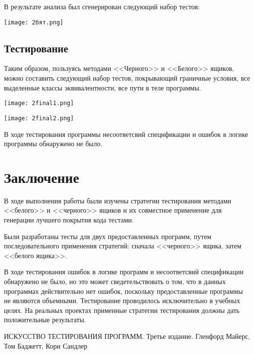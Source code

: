 \documentclass[12pt]{article}
\begin{document}
В результате анализа был сгенерирован следующий набор тестов:

\vskip 1cm
{
    \centering
    \texttt{[image: 2бят.png]}
   
    \label{fig:i1}
}


\subsection{Тестирование}


Таким образом, пользуясь методами <<Черного>> и <<Белого>>
ящиков, можно составить следующий набор тестов, покрывающий граничные условия, все выделенные классы эквивалентности, все пути в теле программы.

\vskip 1cm
{
    \centering
    \texttt{[image: 2final1.png]}
   
    \label{fig:i1}
}


{
    \centering
    \texttt{[image: 2final2.png]}
   
    \label{fig:i1}
}

\vskip 1cm
В ходе тестирования программы несоответсвий спецификации и ошибок в логике программы обнаружено не было.



\newpage

\section*{Заключение}
В ходе выполнения работы были изучены стратегии тестирования методами <<белого>> и <<черного>> ящиков и их совместное применение для генерации лучшего покрытия кода тестами.

Были разработаны тесты для двух предоставленных программ, путем последовательного применения стратегий:
 сначала <<черного>> ящика, затем <<белого ящика>>.
 
 В ходе тестирования ошибок в логике программ и несоответсвий спецификации обнаружено не было, но это может сведетельствовать о том, что в данных программах действительно нет ошибок, поскольку предоставленные программы не являются объемными. Тестирование проводилось исключительно в учебных целях. На реальных проектах применные стратегии тестирования должны дать положительные результаты.












 \newpage
\renewcommand{\refname}{Список использованных источников}
\begin{thebibliography}{99}

  

      {ИСКУССТВО ТЕСТИРОВАНИЯ ПРОГРАММ.
Третье издание. Гленфорд Майерс, Том Баджетт, Кори Сандлер}
    
     

\end{thebibliography}
\end{document}
